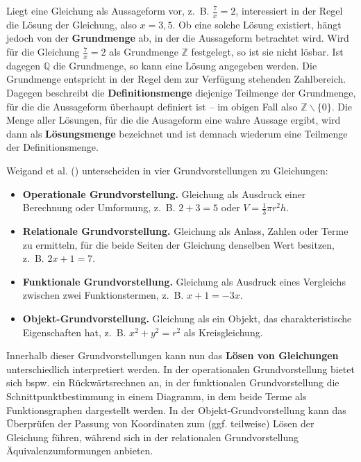\documentclass[
]{scrbook}
\providecommand{\tightlist}{%
  \setlength{\itemsep}{0pt}\setlength{\parskip}{0pt}}
\theoremstyle{definition}
\theoremstyle{definition}
\theoremstyle{definition}
\theoremstyle{definition}
\theoremstyle{remark}
\begin{document}
Liegt eine Gleichung als Aussageform vor, z.~B. \(\frac{7}{x} = 2\), interessiert in der Regel die Lösung der Gleichung, also \(x = 3,\!5\). Ob eine solche Lösung existiert, hängt jedoch von der \textbf{Grundmenge} ab, in der die Aussageform betrachtet wird. Wird für die Gleichung \(\frac{7}{x} = 2\) als Grundmenge \(\mathbb{Z}\) festgelegt, so ist sie nicht lösbar. Ist dagegen \(\mathbb{Q}\) die Grundmenge, so kann eine Lösung angegeben werden. Die Grundmenge entspricht in der Regel dem zur Verfügung stehenden Zahlbereich. Dagegen beschreibt die \textbf{Definitionsmenge} diejenige Teilmenge der Grundmenge, für die die Aussageform überhaupt definiert ist -- im obigen Fall also \(\mathbb{Z}\backslash\{0\}\). Die Menge aller Lösungen, für die die Ausageform eine wahre Aussage ergibt, wird dann als \textbf{Lösungsmenge} bezeichnet und ist demnach wiederum eine Teilmenge der Definitionsmenge.

Weigand et al. () unterscheiden in vier Grundvorstellungen zu Gleichungen:

\begin{itemize}
\tightlist
\item
  \textbf{Operationale Grundvorstellung.} Gleichung als Ausdruck einer Berechnung oder Umformung, z.~B. \(2+3 = 5\) oder \(V = \frac{1}{3}\pi r^2 h\).
\item
  \textbf{Relationale Grundvorstellung.} Gleichung als Anlass, Zahlen oder Terme zu ermitteln, für die beide Seiten der Gleichung denselben Wert besitzen, z.~B. \(2x +1 = 7\).
\item
  \textbf{Funktionale Grundvorstellung.} Gleichung als Ausdruck eines Vergleichs zwischen zwei Funktionstermen, z.~B. \(x+1 = -3x\).
\item
  \textbf{Objekt-Grundvorstellung.} Gleichung als ein Objekt, das charakteristische Eigenschaften hat, z.~B. \(x^2 +y^2 = r^2\) als Kreisgleichung.
\end{itemize}

Innerhalb dieser Grundvorstellungen kann nun das \textbf{Lösen von Gleichungen} unterschiedlich interpretiert werden. In der operationalen Grundvorstellung bietet sich bspw. ein Rückwärtsrechnen an, in der funktionalen Grundvorstellung die Schnittpunktbestimmung in einem Diagramm, in dem beide Terme als Funktionsgraphen dargestellt werden. In der Objekt-Grundvorstellung kann das Überprüfen der Passung von Koordinaten zum (ggf. teilweise) Lösen der Gleichung führen, während sich in der relationalen Grundvorstellung Äquivalenzumformungen anbieten.
\end{document}
